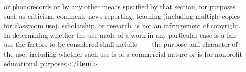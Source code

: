 \begin{shaded}
\hspace*{1em}\hspace*{1em} or phonorecords or by any other means specified by that section,\mbox{}\newline 
\hspace*{1em}\hspace*{1em} for purposes such as criticism, comment, news reporting,\mbox{}\newline 
\hspace*{1em}\hspace*{1em} teaching (including multiple copies for classroom use),\mbox{}\newline 
\hspace*{1em}\hspace*{1em} scholarship, or research, is not an infringement of copyright.\mbox{}\newline 
\hspace*{1em}\hspace*{1em} In determining whether the use made of a work in any particular\mbox{}\newline 
\hspace*{1em}\hspace*{1em} case is a fair use the factors to be considered shall\mbox{}\newline 
\hspace*{1em}\hspace*{1em} include — \mbox{}\newline 
{}\mbox{}\newline 
\hspace*{1em}\hspace*{1em}the purpose and character of the use, including\mbox{}\newline 
\hspace*{1em}\hspace*{1em}\hspace*{1em}\hspace*{1em}\hspace*{1em}\hspace*{1em} whether such use is of a commercial nature or is for nonprofit\mbox{}\newline 
\hspace*{1em}\hspace*{1em}\hspace*{1em}\hspace*{1em}\hspace*{1em}\hspace*{1em} educational purposes;{</\textbf{item}>}\mbox{}\newline 

\end{shaded}
